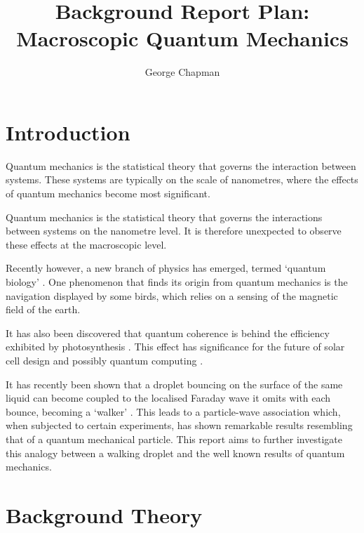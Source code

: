 \documentclass[11pt,twocolumn]{article}
\author{George Chapman}
\title{Background Report Plan: Macroscopic Quantum Mechanics}
\begin{document}
\maketitle

\section{Introduction}
\label{sec:introduction}

Quantum mechanics is the statistical theory that governs the interaction between systems.  These systems are typically on the scale of nanometres, where the effects of quantum mechanics become most significant.

Quantum mechanics is the statistical theory that governs the interactions between systems on the nanometre level.
It is therefore unexpected to observe these effects at the macroscopic level.

Recently however, a new branch of physics has emerged, termed `quantum biology' \cite{11}.  One phenomenon that finds its origin from quantum mechanics is the navigation displayed by some birds, which relies on a sensing of the magnetic field of the earth.

It has also been discovered that quantum coherence is behind the efficiency exhibited by photosynthesis \cite{11,14}.  This effect has significance for the future of solar cell design and possibly quantum computing \cite{11}.

It has recently been shown that a droplet bouncing on the surface of the same liquid can become coupled to the localised Faraday wave it omits with each bounce, becoming a `walker' \cite{1,5,9}.  This leads to a particle-wave association which, when subjected to certain experiments, has shown remarkable results resembling that of a quantum mechanical particle.  This report aims to further investigate this analogy between a walking droplet and the well known results of quantum mechanics.

\section{Background Theory}
\end{document}

